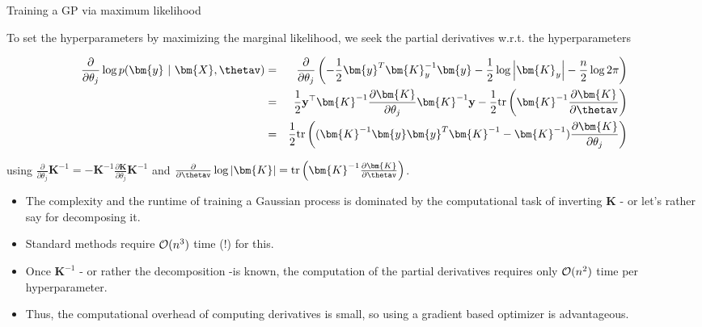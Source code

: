 \documentclass[11pt,compress,t,notes=noshow, xcolor=table]{beamer}
\begin{document}
\begin{vbframe}{Training a GP via maximum likelihood}

To set the hyperparameters by maximizing the marginal likelihood, we seek the partial derivatives w.r.t. the hyperparameters

\begin{footnotesize}
\begin{eqnarray*}
\frac{\partial}{\partial\theta_j} \log p(\bm{y} ~|~ \bm{X}, \thetav) &=& \frac{\partial}{\partial\theta_j}  \left(-\frac{1}{2}\bm{y}^T\bm{K}_y^{-1} \bm{y} - \frac{1}{2} \log \left| \bm{K}_y \right| - \frac{n}{2} \log 2\pi\right) \\ 
&=&\frac{1}{2} \yv^\top \bm{K}^{-1} \frac{\partial \bm{K}}{\partial \theta_j}\bm{K}^{-1} \yv - \frac{1}{2} \text{tr}\left(\bm{K}^{-1} \frac{\partial \bm{K}}{\partial \thetav} \right) \\
&=& \frac{1}{2} \text{tr}\left((\bm{K}^{-1}\bm{y}\bm{y}^T\bm{K}^{-1} - \bm{K}^{-1})\frac{\partial\bm{K}}{\partial\theta_j}\right)
\end{eqnarray*}
\end{footnotesize}

using $\frac{\partial}{\partial \theta_j} \bm{K}^{-1} = - \bm{K}^{-1} \frac{\partial \bm{K}}{\partial \theta_j}\bm{K}^{-1}$ and $\frac{\partial}{\partial \thetav} \log  |\bm{K}| = \text{tr}\left(\bm{K}^{-1} \frac{\partial \bm{K}}{\partial \thetav} \right)$. 

\framebreak

\begin{itemize}
  \item The complexity and the runtime of training a Gaussian process is dominated by the computational task of inverting $\bm{K}$ - or let's rather say for decomposing it.
  \item Standard methods require $\mathcal{O}(n^3)$ time (!) for this.
  \item Once $\bm{K}^{-1}$ - or rather the decomposition -is known, the computation of the partial derivatives requires only $\mathcal{O}(n^2)$ time per hyperparameter.
  \item  Thus, the computational overhead of computing derivatives is small, so using a gradient based optimizer is advantageous. 
\end{itemize} 


\framebreak 


\end{vbframe}
\end{document}
